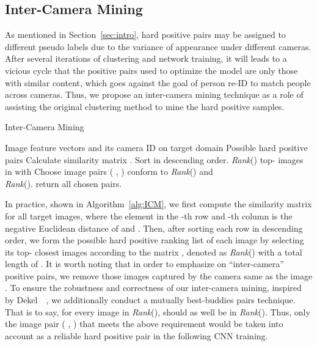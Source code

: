 \vspace{-4mm}
\subsection{Inter-Camera Mining} 
\vspace{-2mm}
\label{sub:ICM}
As mentioned in Section~\ref{sec:intro}, hard positive pairs may be assigned to different pseudo labels due to the variance of appearance under different cameras.
After several iterations of clustering and network training, it will leads to a vicious cycle that the positive pairs used to optimize the model are only those with similar content, which goes against the goal of person re-ID to match people across cameras.
Thus, we propose an inter-camera mining technique as a role of assisting the original clustering method to mine the hard positive samples. 


\begin{algorithm}[t]
    \caption{Inter-Camera Mining}
    \begin{algorithmic}[1]
    \REQUIRE 
        Image feature vectors  and its camera ID  on target domain
    \ENSURE 
        Possible hard positive pairs
    \STATE Calculate similarity matrix .
    \FOR{ = ;  ; =+ }
    \STATE Sort  in descending order.
    \STATE \textit{Rank}()  top- images  in  with 
    \ENDFOR
    \STATE Choose image pairs ( , ) conform to  \textit{Rank}() and \\ \textit{Rank}().
    \STATE return all chosen pairs.
    \end{algorithmic}
    \label{alg:ICM}
\end{algorithm}

In practice, shown in Algorithm~\ref{alg:ICM}, we first compute the similarity matrix  for all target images, where the element in the -th row and -th column is the negative Euclidean distance of   and .
Then, after sorting each row in descending order, we form the possible hard positive ranking list of each image by selecting its top- closest images according to the matrix , denoted as \textit{Rank}() with a total length of . It is worth noting that in order to emphasize on ``inter-camera'' positive pairs, we remove those images captured by the camera same as the image .
To ensure the robustness and correctness of our inter-camera mining, inspired by Dekel~\etal~\cite{BBP}, we additionally conduct a  mutually best-buddies pairs technique. 
That is to say, for every image  in \textit{Rank}(),  should as well be in \textit{Rank}(). Thus, only the image pair ( , ) that meets the above requirement would be taken into account as a reliable hard positive pair in the following CNN training.


